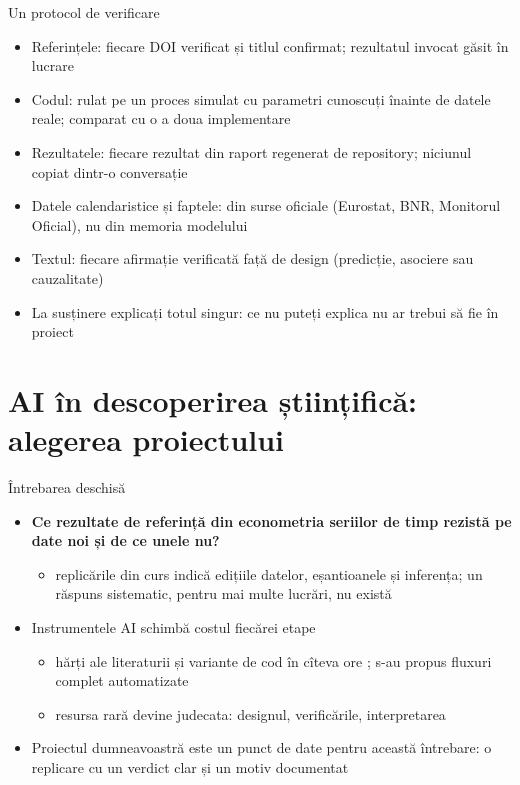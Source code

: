 \begin{frame}{Un protocol de verificare}
\itemsize{\small}
\begin{itemize}
    \item Referințele: fiecare DOI verificat și titlul confirmat; rezultatul invocat găsit în lucrare
    \item Codul: rulat pe un proces simulat cu parametri cunoscuți înainte de datele reale; comparat cu o a doua implementare
    \item Rezultatele: fiecare rezultat din raport regenerat de repository; niciunul copiat dintr-o conversație
    \item Datele calendaristice și faptele: din surse oficiale (Eurostat, BNR, Monitorul Oficial), nu din memoria modelului
    \item Textul: fiecare afirmație verificată față de design (predicție, asociere sau cauzalitate)
    \item La susținere explicați totul singur: ce nu puteți explica nu ar trebui să fie în proiect
\end{itemize}
\end{frame}


\section{AI în descoperirea științifică: alegerea proiectului}

\begin{frame}{Întrebarea deschisă}
\itemsize{\small}
\begin{itemize}
    \item \textbf{Ce rezultate de referință din econometria seriilor de timp rezistă pe date noi și de ce unele nu?}
    \begin{itemize}
        \item replicările din curs indică edițiile datelor, eșantioanele și inferența; un răspuns sistematic, pentru mai multe lucrări, nu există
    \end{itemize}
    \item Instrumentele AI schimbă costul fiecărei etape
    \begin{itemize}
        \item hărți ale literaturii și variante de cod în cîteva ore ; s-au propus fluxuri complet automatizate 
        \item resursa rară devine judecata: designul, verificările, interpretarea
    \end{itemize}
    \item Proiectul dumneavoastră este un punct de date pentru această întrebare: o replicare cu un verdict clar și un motiv documentat
\end{itemize}
\end{frame}

